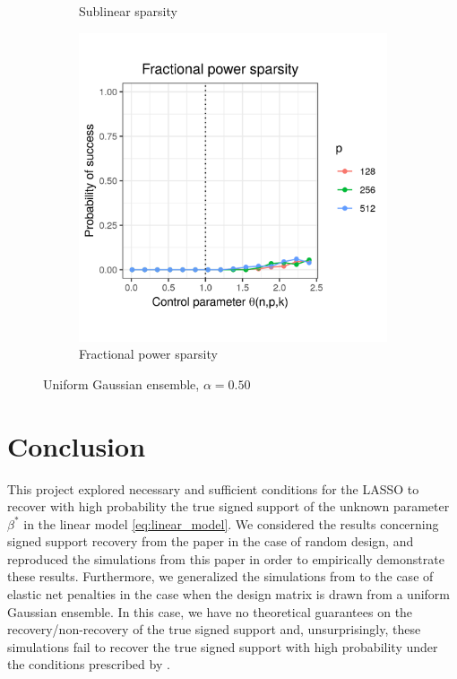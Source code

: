 \documentclass[letterpaper,12pt]{article}
\begin{document}
\begin{figure}[h]
\begin{subfigure}{0.32\textwidth}
    \caption{Sublinear sparsity}
    \label{fig:uniform_sublinear_sparsity_alpha_1}
  \end{subfigure}
  \begin{subfigure}{0.32\textwidth}
    \includegraphics[width=0.9\linewidth]{uniform_fractional_power_sparsity_alpha_050}
    \caption{Fractional power sparsity}
    \label{fig:uniform_fractional_power_sparsity_alpha_1}
  \end{subfigure}
  \caption{Uniform Gaussian ensemble, $\alpha = 0.50$}
  \label{fig:uniform_alpha_050}
\end{figure}

\section*{Conclusion}

This project explored necessary and sufficient conditions for the
LASSO to recover with high probability the true signed support of the
unknown parameter $\beta^\ast$ in the linear model
\eqref{eq:linear_model}. We considered the results concerning signed
support recovery from the paper \cite{wainwright06} in the case of
random design, and reproduced the simulations from this paper in order
to empirically demonstrate these results. Furthermore, we generalized
the simulations from \cite{wainwright06} to the case of elastic net
penalties \cite{zou_hastie05} in the case when the design matrix is
drawn from a uniform Gaussian ensemble. In this case, we have no
theoretical guarantees on the recovery/non-recovery of the true signed
support and, unsurprisingly, these simulations fail to recover the
true signed support with high probability under the conditions
prescribed by \cite{wainwright06}.
\end{document}
